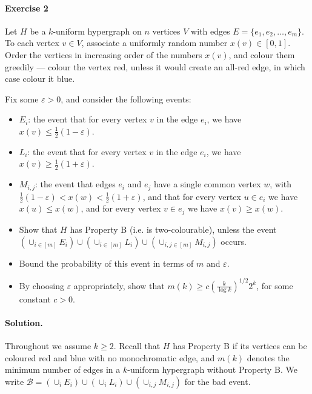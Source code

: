 \documentclass[a4paper,12pt]{article}
\begin{document}
\paragraph{Exercise 2}  Let $H$ be a $k$-uniform hypergraph on $n$ vertices $V$ with edges $E = \{ e_1, e_2, \hdots, e_m \}$. To each vertex $v \in V$, associate a uniformly random number $x(v) \in [0,1]$. Order the vertices in increasing order of the numbers $x(v)$, and colour them greedily --- colour the vertex red, unless it would create an all-red edge, in which case colour it blue.

Fix some $\varepsilon > 0$, and consider the following events:
\begin{itemize}
	\item $E_i$: the event that for every vertex $v$ in the edge $e_i$, we have $x(v) \le \frac12(1- \varepsilon)$.
	\item $L_i$: the event that for every vertex $v$ in the edge $e_i$, we have $x(v) \ge \frac12(1 + \varepsilon)$.
	\item $M_{i,j}$: the event that edges $e_i$ and $e_j$ have a single common vertex $w$, with $\frac12(1 - \varepsilon) < x(w) < \frac12(1 + \varepsilon)$, and that for every vertex $u \in e_i$ we have $x(u) \le x(w)$, and for every vertex $v \in e_j$ we have $x(v) \ge x(w)$.
\end{itemize}

\begin{itemize}
	\item[(a)] Show that $H$ has Property B (i.e. is two-colourable), unless the event $\left( \cup_{i \in [m]} E_i \right) \cup \left( \cup_{i \in [m]} L_i \right) \cup \left( \cup_{i,j \in [m]} M_{i,j} \right)$ occurs.
	\item[(b)] Bound the probability of this event in terms of $m$ and $\varepsilon$.
	\item[(c)] By choosing $\varepsilon$ appropriately, show that $m(k) \ge c \left( \frac{k}{\log k} \right)^{1/2} 2^k$, for some constant $c > 0$.
\end{itemize}

\paragraph{Solution.} Throughout we assume $k \ge 2$. Recall that $H$ has Property B if its vertices can be coloured red and blue with no monochromatic edge, and $m(k)$ denotes the minimum number of edges in a $k$-uniform hypergraph without Property B. We write $\mathcal{B} = \left( \cup_{i} E_i \right) \cup \left( \cup_{i} L_i \right) \cup \left( \cup_{i,j} M_{i,j} \right)$ for the bad event.
\end{document}
